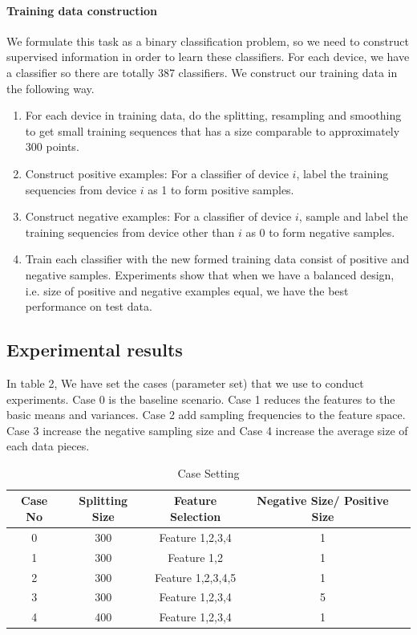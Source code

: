 \documentclass[11pt,letterpaper]{article}
\begin{document}
\paragraph{Training data construction}
We formulate this task as a binary classification problem, so we need to construct supervised information in order to learn these classifiers. For each device, we have a classifier so there are totally 387 classifiers. We construct our training data in the following way.
\begin{enumerate}
\item For each device in training data, do the splitting, resampling and smoothing to get small training sequences that has a size comparable to approximately 300 points.
\item Construct positive examples: For a classifier of device $i$, label the training sequencies from device $i$ as 1 to form positive samples.
\item Construct negative examples: For a classifier of device $i$, sample and label the training sequencies from device other than $i$ as 0 to form negative samples.
\item Train each classifier with the new formed training data consist of positive and negative samples. Experiments show that when we have a balanced design, i.e. size of positive and negative examples equal, we have the best performance on test data.
\end{enumerate}

\subsection{Experimental results}
\label{sec:experimental-results}
	
In table 2, We have set the cases (parameter set) that we use to conduct experiments. Case 0 is the baseline scenario. Case 1 reduces the features to the basic means and variances. Case 2 add sampling frequencies to the feature space. Case 3 increase the negative sampling size and Case 4 increase the average size of each data pieces.
	
	\begin{table}
		\centering
		\caption{Case Setting}
		\begin{tabular}{c|c|c|c|c}
			Case No & Splitting Size & Feature Selection & Negative Size/ Positive Size \\ \hline
			0 & 300 & Feature 1,2,3,4 & 1 \\
			1 & 300 & Feature 1,2     & 1  \\
			2 & 300 & Feature 1,2,3,4,5 & 1 \\
			3 & 300 & Feature 1,2,3,4 & 5  \\
			4 & 400 & Feature 1,2,3,4 & 1 \\
		\end{tabular}
	\end{table}
\end{document}

